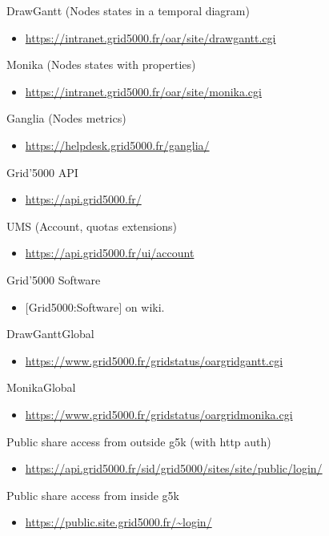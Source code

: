 DrawGantt (Nodes states in a temporal diagram)
\begin{itemize}
\item \url{https://intranet.grid5000.fr/oar/site/drawgantt.cgi}
\end{itemize}

Monika (Nodes states with properties)
\begin{itemize}
\item \url{https://intranet.grid5000.fr/oar/site/monika.cgi}
\end{itemize}

Ganglia (Nodes metrics)
\begin{itemize}
\item \url{https://helpdesk.grid5000.fr/ganglia/}
\end{itemize}

Grid'5000 API
\begin{itemize}
\item \url{https://api.grid5000.fr/}
\end{itemize}

UMS (Account, quotas extensions)
\begin{itemize}
\item \url{https://api.grid5000.fr/ui/account}
\end{itemize}

Grid'5000 Software
\begin{itemize}
\item $[$Grid5000:Software$]$ on wiki.
\end{itemize}

DrawGanttGlobal
\begin{itemize}
\item \url{https://www.grid5000.fr/gridstatus/oargridgantt.cgi}
\end{itemize}

MonikaGlobal
\begin{itemize}
\item \url{https://www.grid5000.fr/gridstatus/oargridmonika.cgi}
\end{itemize}

Public share access from outside g5k (with http auth)
\begin{itemize}
\item \url{https://api.grid5000.fr/sid/grid5000/sites/site/public/login/}
\end{itemize}

Public share access from inside g5k
\begin{itemize}
\item \url{https://public.site.grid5000.fr/~login/}
\end{itemize}

